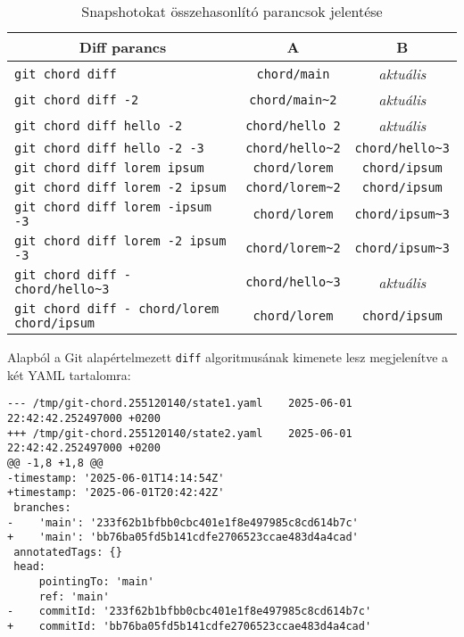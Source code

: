 \documentclass[final]{elteikthesis}[2025/03/25]
\begin{document}
\begin{table}[h]
\captionsetup{justification=justified, singlelinecheck=false}
\begin{center}
\begin{tabular}{|l|c|c|} 
 \hline
 \multicolumn{1}{|c}{\textbf{Diff parancs}} &
 \multicolumn{1}{|c}{\textbf{A}} &
 \multicolumn{1}{|c|}{\textbf{B}} \\
 \hline\hline
 
 \texttt{git chord diff} & \texttt{chord/main} & \textit{aktuális} \\
 \texttt{git chord diff -2} & \texttt{chord/main\~{}2} & \textit{aktuális} \\
 \texttt{git chord diff hello -2} & \texttt{chord/hello~{}2} & \textit{aktuális} \\
 \texttt{git chord diff hello -2 -3} & \texttt{chord/hello\~{}2} & \texttt{chord/hello\~{}3} \\
 \texttt{git chord diff lorem ipsum} & \texttt{chord/lorem} & \texttt{chord/ipsum} \\
 \texttt{git chord diff lorem -2 ipsum} & \texttt{chord/lorem\~{}2} & \texttt{chord/ipsum} \\
 \texttt{git chord diff lorem -ipsum -3} & \texttt{chord/lorem} & \texttt{chord/ipsum\~{}3} \\
 \texttt{git chord diff lorem -2 ipsum -3} & \texttt{chord/lorem\~{}2} & \texttt{chord/ipsum\~{}3} \\
 \texttt{git chord diff - chord/hello\~{}3} & \texttt{chord/hello\~{}3} & \textit{aktuális} \\
 \texttt{git chord diff - chord/lorem chord/ipsum} & \texttt{chord/lorem} & \texttt{chord/ipsum} \\
 
 \hline
 
\end{tabular}
\end{center}
\caption{Snapshotokat összehasonlító parancsok jelentése}
\label{tab:diff-commands}
\end{table}

Alapból a Git alapértelmezett \verb|diff| algoritmusának kimenete lesz megjelenítve a két YAML tartalomra:

\begin{verbatim}
--- /tmp/git-chord.255120140/state1.yaml	2025-06-01 22:42:42.252497000 +0200
+++ /tmp/git-chord.255120140/state2.yaml	2025-06-01 22:42:42.252497000 +0200
@@ -1,8 +1,8 @@
-timestamp: '2025-06-01T14:14:54Z'
+timestamp: '2025-06-01T20:42:42Z'
 branches:
-    'main': '233f62b1bfbb0cbc401e1f8e497985c8cd614b7c'
+    'main': 'bb76ba05fd5b141cdfe2706523ccae483d4a4cad'
 annotatedTags: {}
 head:
     pointingTo: 'main'
     ref: 'main'
-    commitId: '233f62b1bfbb0cbc401e1f8e497985c8cd614b7c'
+    commitId: 'bb76ba05fd5b141cdfe2706523ccae483d4a4cad'
\end{verbatim}
\end{document}
